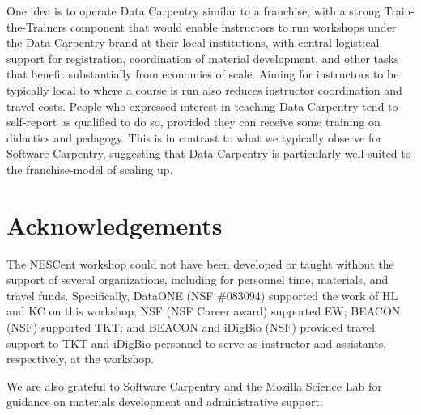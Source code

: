 \documentclass[11pt]{article}
\begin{document}
One idea is to operate Data Carpentry similar to a franchise, with a strong Train-the-Trainers component that would enable
instructors to run workshops under the Data Carpentry brand at their local institutions, with central logistical support for registration, coordination of material development, and other tasks that benefit substantially from economies of scale.
Aiming for instructors to be typically local to where a course is run also reduces instructor coordination and travel costs.
People who expressed interest in teaching Data Carpentry tend to self-report as qualified to do so, provided they can 
receive some training on didactics and pedagogy. 
This is in contrast to what we typically observe for Software Carpentry, suggesting that Data Carpentry is
particularly well-suited to the franchise-model of scaling up.

\section{Acknowledgements}

The NESCent workshop could not have been developed or taught without the support of several organizations, including for personnel time, materials, and travel funds. Specifically, DataONE (NSF \#083094) supported the work of HL and KC on this workshop; NSF (NSF Career award) supported EW; BEACON (NSF) supported TKT; and BEACON and iDigBio (NSF) provided travel support to TKT and iDigBio personnel to serve as instructor and assistants, respectively, at the workshop.

We are also grateful to Software Carpentry and the Mozilla Science Lab for guidance on materials development and administrative support.
\end{document}
